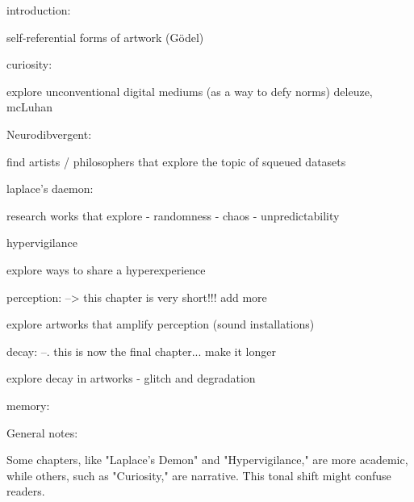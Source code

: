 


introduction:

self-referential forms of artwork
(Gödel)

curiosity:

explore unconventional digital mediums (as a way to defy norms)
deleuze, mcLuhan

Neurodibvergent:

find artists / philosophers that explore the topic of squeued datasets 


laplace's daemon:

research works that explore 
- randomness 
- chaos 
- unpredictability 

hypervigilance

explore ways to share a hyperexperience
 

perception: --> this chapter is very short!!! add more

explore artworks that amplify perception 
(sound installations)

decay: --. this is now the final chapter... make it longer 


explore decay in artworks 
 - glitch and degradation 


 memory: 



General notes: 

Some chapters, like "Laplace’s Demon" and "Hypervigilance," are more academic, while others, such as "Curiosity," are narrative. This tonal shift might confuse readers.
